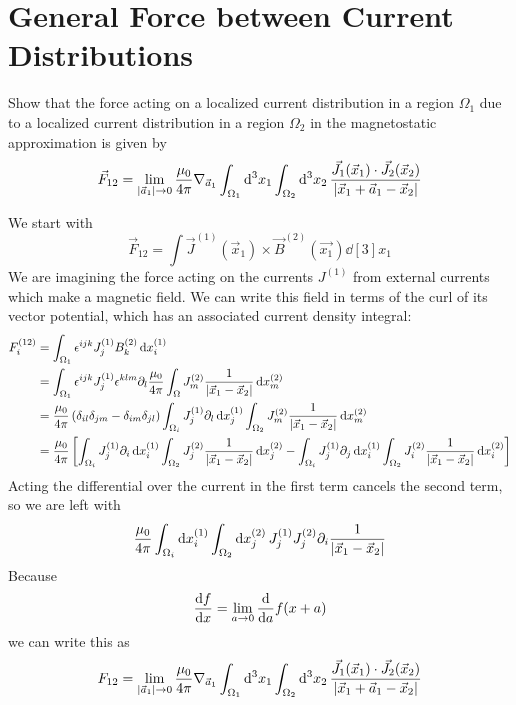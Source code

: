 \documentclass[a4paper,twoside]{article}
\begin{document}
\section{General Force between Current Distributions}
Show that the force acting on a localized current distribution in a region $ \Omega_1 $ due to a localized current distribution in a region $ \Omega_2 $ in the magnetostatic approximation is given by
\begin{equation}
    \vec{F}_{12} = \lim_{\abs{ \vec{a}_1} \to 0} \frac{\mu_0}{4 \pi} \nabla_{ \vec{a}_1} \int_{\Omega_1} \dd[3]{x_1} \int_{\Omega_2} \dd[3]{x_2} \frac{ \vec{J}_1( \vec{x}_1) \cdot \vec{J}_2( \vec{x}_2)}{\abs{ \vec{x}_1 + \vec{a}_1 - \vec{x}_2}}
\end{equation}
\begin{problem}
   We start with
   \begin{equation}
       \vec{F}_{12} = \int \vec{J}^{(1)}( \vec{x}_1) \times \vec{B}^{(2)}( \vec{x_1}) \dd[3]{x_1}
   \end{equation}
   We are imagining the force acting on the currents $ J^{(1)} $ from external currents which make a magnetic field. We can write this field in terms of the curl of its vector potential, which has an associated current density integral:
   \begin{align}
       F^{(12)}_i &= \int_{\Omega_1} \epsilon^{ijk} J^{(1)}_j B^{(2)}_k \dd{x^{(1)}_i}\\
       &= \int_{\Omega_1} \epsilon^{ijk} J^{(1)}_j \epsilon^{klm} \partial_l \frac{\mu_0}{4 \pi} \int_{\Omega} J^{(2)}_m \frac{1}{\abs{ \vec{x}_1 - \vec{x}_2}} \dd{x^{(2)}_m}\\
       &= \frac{\mu_0}{4 \pi} \left( \delta_{il} \delta_{jm} - \delta_{im} \delta_{jl} \right) \int_{\Omega_i}J^{(1)}_j \partial_l \dd{x^{(1)}_j} \int_{\Omega_2} J^{(2)}_m \frac{1}{\abs{ \vec{x}_1 - \vec{x}_2}} \dd{x^{(2)}_m}\\
       &= \frac{\mu_0}{4 \pi} \left[ \int_{\Omega_i} J^{(1)}_j \partial_i \dd{x^{(1)}_i} \int_{\Omega_2} J^{(2)}_j \frac{1}{\abs{ \vec{x}_1 - \vec{x}_2}} \dd{x^{(2)}_j} - \int_{\Omega_i} J^{(1)}_j \partial_j \dd{x^{(1)}_i} \int_{\Omega_2} J^{(2)}_i \frac{1}{\abs{ \vec{x}_1 - \vec{x}_2}} \dd{x^{(2)}_i} \right]
   \end{align}
    Acting the differential over the current in the first term cancels the second term, so we are left with
    \begin{equation}
        \frac{\mu_0}{4 \pi} \int_{\Omega_i} \dd{x^{(1)}_i} \int_{\Omega_2} \dd{x^{(2)}_j} J^{(1)}_j J^{(2)}_j \partial_i \frac{1}{\abs{ \vec{x}_1 - \vec{x}_2}}
    \end{equation}
    Because
    \begin{equation}
        \dv{f}{x}= \lim_{a \to 0} \dv{a}f(x+a)
    \end{equation}
    we can write this as
    \begin{equation}
        F_{12} = \lim_{\abs{ \vec{a}_1} \to 0} \frac{\mu_0}{4 \pi} \nabla_{ \vec{a}_1} \int_{\Omega_1} \dd[3]{x_1} \int_{\Omega_2} \dd[3]{x_2} \frac{ \vec{J}_1( \vec{x}_1) \cdot \vec{J}_2( \vec{x}_2)}{\abs{ \vec{x}_1 + \vec{a}_1 - \vec{x}_2}}
    \end{equation}
\end{problem}
\end{document}
